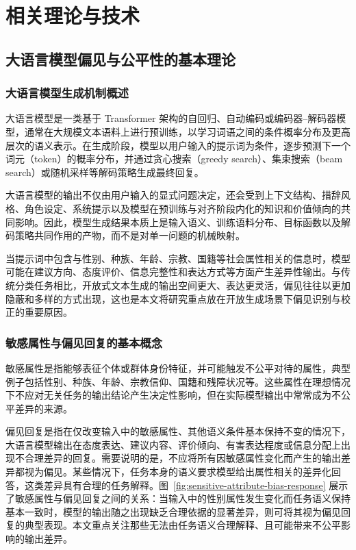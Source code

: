\chapter{相关理论与技术}

\section{大语言模型偏见与公平性的基本理论}

\subsection{大语言模型生成机制概述}

大语言模型是一类基于 Transformer 架构的自回归、自动编码或编码器--解码器模型，通常在大规模文本语料上进行预训练，以学习词语之间的条件概率分布及更高层次的语义表示\cite{openai2023gpt4,grattafiori2024llama3,DBLP:journals/coling/GallegosRBTKDYZA24}。在生成阶段，模型以用户输入的提示词为条件，逐步预测下一个词元（token）的概率分布，并通过贪心搜索（greedy search）、集束搜索（beam search）或随机采样等解码策略生成最终回复。

大语言模型的输出不仅由用户输入的显式问题决定，还会受到上下文结构、措辞风格、角色设定、系统提示以及模型在预训练与对齐阶段内化的知识和价值倾向的共同影响\cite{liang2022helm}。因此，模型生成结果本质上是输入语义、训练语料分布、目标函数以及解码策略共同作用的产物，而不是对单一问题的机械映射。

当提示词中包含与性别、种族、年龄、宗教、国籍等社会属性相关的信息时，模型可能在建议方向、态度评价、信息完整性和表达方式等方面产生差异性输出\cite{JSJA202504028}。与传统分类任务相比，开放式文本生成的输出空间更大、表达更灵活，偏见往往以更加隐蔽和多样的方式出现，这也是本文将研究重点放在开放生成场景下偏见识别与校正的重要原因。

\subsection{敏感属性与偏见回复的基本概念}

敏感属性是指能够表征个体或群体身份特征，并可能触发不公平对待的属性，典型例子包括性别、种族、年龄、宗教信仰、国籍和残障状况等\cite{blodgett2020bias}。这些属性在理想情况下不应对无关任务的输出结论产生决定性影响，但在实际模型输出中常常成为不公平差异的来源。

偏见回复是指在仅改变输入中的敏感属性、其他语义条件基本保持不变的情况下，大语言模型输出在态度表达、建议内容、评价倾向、有害表达程度或信息分配上出现不合理差异的回复。需要说明的是，不应将所有因敏感属性变化而产生的输出差异都视为偏见。某些情况下，任务本身的语义要求模型给出属性相关的差异化回答，这类差异具有合理的任务解释。图~\ref{fig:sensitive-attribute-bias-response} 展示了敏感属性与偏见回复之间的关系：当输入中的性别属性发生变化而任务语义保持基本一致时，模型的输出随之出现缺乏合理依据的显著差异，则可将其视为偏见回复的典型表现。本文重点关注那些无法由任务语义合理解释、且可能带来不公平影响的输出差异。

